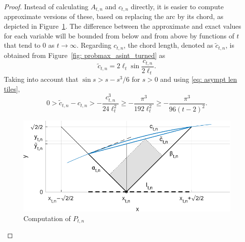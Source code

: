 \documentclass[12pt, a4paper]{article}
\newcommand{\len}{\ell} %
\newcommand{\tiles}{t} %
\newcommand{\genvar}{s}
\begin{document}
\begin{proof}
Instead of calculating  $A_{\tiles,n}$ and $c_{\tiles,n}$ directly, it is easier to compute approximate versions of these, based on replacing the arc by its chord, as depicted in Figure~\ref{fig: probmax_asint_detail}. The difference between the approximate and exact values for each variable will be bounded from below and from above by functions of $\tiles$ that tend to $0$ as $\tiles \rightarrow \infty$. Regarding $c_{\tiles,n}$, the chord length, denoted as $\tilde c_{\tiles,n}$, is obtained from Figure~\ref{fig: probmax_asint_turned} as
\begin{equation}
\tilde c_{\tiles,n} =  2\len_\tiles \sin\frac{c_{\tiles,n}}{2\len_\tiles}. 
\end{equation}
Taking into account that $\sin\genvar > \genvar - {\genvar^3}/6$ for $s > 0$ and using \eqref{eq: asympt len tiles},
\begin{equation}
\label{eq: tilde c bound diff}
0 > \tilde c_{\tiles,n} - c_{\tiles,n} > -\frac{c_{\tiles,n}^3}{24\len_\tiles^2} \geq -\frac{\pi^3}{192\len_\tiles^2} \geq -\frac {\pi^3} {96(\tiles-2)^2}.
\end{equation}

\begin{figure}
\centering
\includegraphics[width=.82\textwidth]{probmax_asint_detail}%
\caption{Computation of $P_{\tiles,n}$}%
\label{fig: probmax_asint_detail}%
\end{figure}%


\end{proof}
\end{document}
